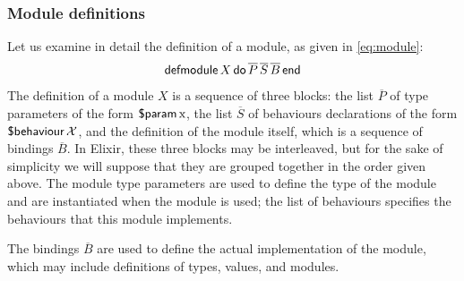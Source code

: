 \documentclass[a4paper,10pt]{article}
\begin{document}
\subsubsection{Module definitions}
Let us examine in detail the definition of a module, as given in \eqref{eq:module}:
%
\[\operatorname{\textsf{defmodule}} X \operatorname{\textsf{do}} \overline{P}\, \overline{S}\, \overline{B} \operatorname{\textsf{end}}\]
%
The definition of a module $X$ is a sequence of three blocks: the list $\overline P$ of type parameters of the form $\operatorname{\textsf{\$param}} \text{\rm x}$, the list $\overline S$ of behaviours declarations of the form  $\operatorname{\textsf{\$behaviour}} \mathcal{X}$, and the definition of the module itself, which is a sequence of bindings $\overline{B}$. In Elixir, these three blocks may be interleaved, but for the sake of simplicity we will suppose that they are grouped together in the order given above. The module type parameters are used to define the type of the module and are instantiated when the module is used; the list of behaviours specifies the behaviours that this module implements. 

The bindings $\overline{B}$ are used to define the actual implementation of the module, which may include definitions of types, values, and modules.
\end{document}
